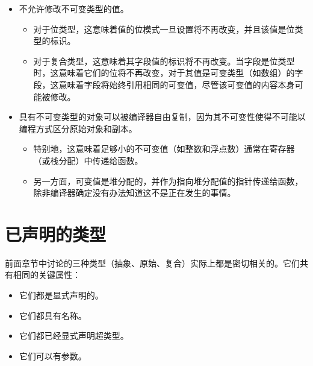 \begin{itemize}
\item 不允许修改不可变类型的值。

\begin{itemize}
\item 对于位类型，这意味着值的位模式一旦设置将不再改变，并且该值是位类型的标识。


\item 对于复合类型，这意味着其字段值的标识将不再改变。当字段是位类型时，这意味着它们的位将不再改变，对于其值是可变类型（如数组）的字段，这意味着字段将始终引用相同的可变值，尽管该可变值的内容本身可能被修改。

\end{itemize}

\item 具有不可变类型的对象可以被编译器自由复制，因为其不可变性使得不可能以编程方式区分原始对象和副本。

\begin{itemize}
\item 特别地，这意味着足够小的不可变值（如整数和浮点数）通常在寄存器（或栈分配）中传递给函数。


\item 另一方面，可变值是堆分配的，并作为指向堆分配值的指针传递给函数，除非编译器确定没有办法知道这不是正在发生的事情。

\end{itemize}
\end{itemize}


\hypertarget{10034263194628846298}{}


\section{已声明的类型}



前面章节中讨论的三种类型（抽象、原始、复合）实际上都是密切相关的。它们共有相同的关键属性：



\begin{itemize}
\item 它们都是显式声明的。


\item 它们都具有名称。


\item 它们都已经显式声明超类型。


\item 它们可以有参数。

\end{itemize}


